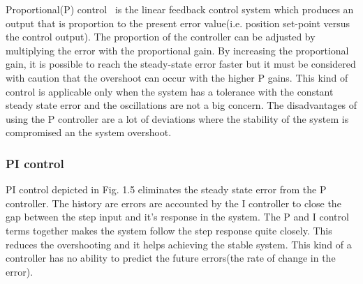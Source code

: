 Proportional(P) control~\cite{temelp} is the linear feedback control system which produces an output that is proportion to the present error value(i.e. position set-point versus the control output). The proportion of the controller can be adjusted by multiplying the error with the proportional gain. By increasing the proportional gain, it is possible to reach the steady-state error faster but it must be considered with caution that the overshoot can occur with the higher P gains. This kind of control is applicable only when the system has a tolerance with the constant steady state error and the oscillations are not a big concern. The disadvantages of using the P controller are a lot of deviations where the stability of the system is compromised an the system overshoot.

\begin{center}
\end{center}

\subsubsection*{PI control}
PI control depicted in Fig. 1.5 eliminates the steady state error from the P controller. The history are errors are accounted by the I controller to close the gap between the step input and it's response in the system. The P and I control terms together makes the system follow the step response quite closely. This reduces the overshooting and it helps achieving the stable system. This kind of a controller has no ability to predict the future errors(the rate of change in the error).

